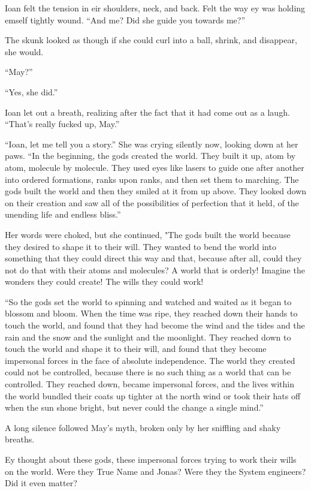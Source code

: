 Ioan felt the tension in eir shoulders, neck, and back. Felt the way ey was holding emself tightly wound. ``And me? Did she guide you towards me?''

The skunk looked as though if she could curl into a ball, shrink, and disappear, she would.

``May?''

``Yes, she did.''

Ioan let out a breath, realizing after the fact that it had come out as a laugh. ``That's really fucked up, May.''

``Ioan, let me tell you a story.'' She was crying silently now, looking down at her paws. ``In the beginning, the gods created the world. They built it up, atom by atom, molecule by molecule. They used eyes like lasers to guide one after another into ordered formations, ranks upon ranks, and then set them to marching. The gods built the world and then they smiled at it from up above. They looked down on their creation and saw all of the possibilities of perfection that it held, of the unending life and endless bliss.''

Her words were choked, but she continued, "The gods built the world because they desired to shape it to their will. They wanted to bend the world into something that they could direct this way and that, because after all, could they not do that with their atoms and molecules? A world that is orderly! Imagine the wonders they could create! The wills they could work!

``So the gods set the world to spinning and watched and waited as it began to blossom and bloom. When the time was ripe, they reached down their hands to touch the world, and found that they had become the wind and the tides and the rain and the snow and the sunlight and the moonlight. They reached down to touch the world and shape it to their will, and found that they become impersonal forces in the face of absolute independence. The world they created could not be controlled, because there is no such thing as a world that can be controlled. They reached down, became impersonal forces, and the lives within the world bundled their coats up tighter at the north wind or took their hats off when the sun shone bright, but never could the change a single mind.''

A long silence followed May's myth, broken only by her sniffling and shaky breaths.

Ey thought about these gods, these impersonal forces trying to work their wills on the world. Were they True Name and Jonas? Were they the System engineers? Did it even matter?

